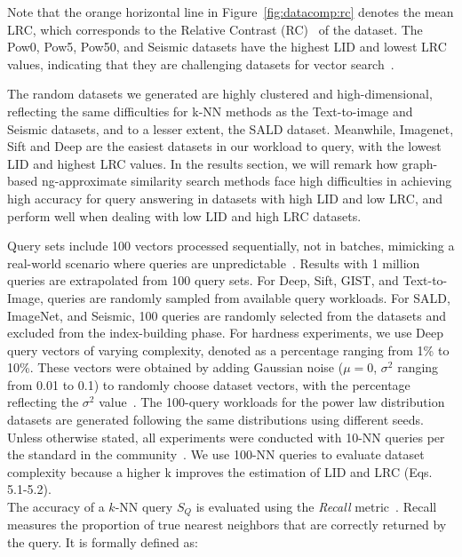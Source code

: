 Note that the orange horizontal line in Figure~\ref{fig:datacomp:rc} denotes the mean LRC, which corresponds to the Relative Contrast (RC)~\cite{DBLP:journals/is/AumullerC21} of the dataset. The Pow0, Pow5, Pow50, and Seismic datasets have the highest LID and lowest LRC values, indicating that they are challenging datasets for vector search~\cite{DBLP:journals/is/AumullerC21}.

The random datasets we generated are highly clustered and high-dimensional, reflecting the same difficulties for k-NN methods as the Text-to-image and Seismic datasets, and to a lesser extent, the SALD dataset. Meanwhile, Imagenet, Sift and Deep are the easiest datasets in our workload to query, with the lowest LID and highest LRC values. In the results section, we will remark how graph-based ng-approximate similarity search methods face high difficulties in achieving high accuracy for query answering in datasets with high LID and low LRC, and perform well when dealing with low LID and high LRC datasets.

  Query sets include 100 vectors processed sequentially, not in batches, mimicking a real-world scenario where queries are unpredictable~\cite{itsawreport,DBLP:conf/edbt/GogolouTPB19,conf/sigmod/gogolou20}. Results with 1 million queries are extrapolated from 100 query sets. For Deep, Sift, GIST, and Text-to-Image, queries are randomly sampled from available query workloads. For SALD, ImageNet, and Seismic, 100 queries are randomly selected from the datasets and excluded from the index-building phase.
For hardness experiments, we use Deep query vectors of varying complexity, denoted as a percentage ranging from 1\% to 10\%. These vectors were obtained by adding Gaussian noise (\(\mu = 0\), \(\sigma^2\) ranging from 0.01 to 0.1) to randomly choose dataset vectors, with the percentage reflecting the \(\sigma^2\) value~\cite{johannesjoural2018}.
The 100-query workloads for the power law distribution datasets are generated following the same distributions using different seeds. %
Unless otherwise stated, all experiments were conducted with 10-NN queries per the standard in the community~\cite{neurips-2021-ann-competition,url/Elpis,ann-benchmark-journal}.
We use 100-NN queries to evaluate dataset complexity because a higher k improves the estimation of LID and LRC (Eqs. 5.1-5.2).
\\
 The accuracy of a $k$-NN query \( S_Q \) is evaluated using the \textit{Recall} metric~\cite{Recall}. Recall measures the proportion of true nearest neighbors that are correctly returned by the query. It is formally defined as:

